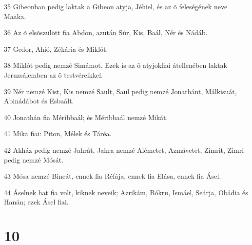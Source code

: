 \par 35 Gibeonban pedig laktak a Gibeon atyja, Jéhiel, és az õ feleségének neve Maaka.
\par 36 Az õ elsõszülött fia Abdon, azután Súr, Kis, Baál, Nér és Nádáb.
\par 37 Gedor, Ahió, Zékária és Miklót.
\par 38 Miklót pedig nemzé Simámot. Ezek is az õ atyjokfiai átellenében laktak Jeruzsálemben az õ testvéreikkel.
\par 39 Nér nemzé Kist, Kis nemzé Sault, Saul pedig nemzé Jonathánt, Málkisuát, Abinádábot és Esbaált.
\par 40 Jonathán fia Méribbaál; és Méribbaál nemzé Mikát.
\par 41 Mika fiai: Piton, Mélek és Táréa.
\par 42 Akház pedig nemzé Jahrát, Jahra nemzé Alémetet, Azmávetet, Zimrit, Zimri pedig nemzé Mósát.
\par 43 Mósa nemzé Bineát, ennek fia Réfája, ennek fia Elása, ennek fia Ásel.
\par 44 Áselnek hat fia volt, kiknek neveik; Azrikám, Bókru, Ismáel, Seárja, Obádia és Hanán; ezek Ásel fiai.

\chapter{10}

